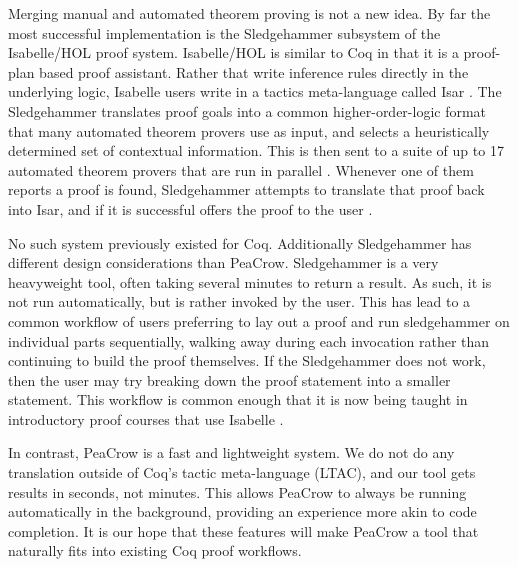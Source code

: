 \documentclass{article}
\begin{document}
Merging manual and automated theorem proving is not a new idea. By far the most successful implementation is the Sledgehammer subsystem of the Isabelle/HOL proof system. Isabelle/HOL is similar to Coq in that it is a proof-plan based proof assistant. Rather that write inference rules directly in the underlying logic, Isabelle users write in a tactics meta-language called Isar \cite{dennis2006comparison}. The Sledgehammer translates proof goals into a common higher-order-logic format that many automated theorem provers use as input, and selects a heuristically determined set of contextual information. This is then sent to a suite of up to 17  automated theorem provers that are run in parallel \cite{blanchette2011hammering}. Whenever one of them reports a proof is found, Sledgehammer attempts to translate that proof back into Isar, and if it is successful offers the proof to the user \cite{meng2006automation}.

No such system previously existed for Coq. Additionally Sledgehammer has different design considerations than PeaCrow. Sledgehammer is a very heavyweight tool, often taking several minutes to return a result. As such, it is not run automatically, but is rather invoked by the user. This has lead to a common workflow of users preferring to lay out a proof and run sledgehammer on individual parts sequentially, walking away during each invocation rather than continuing to build the proof themselves. If the Sledgehammer does not work, then the user may try breaking down the proof statement into a smaller statement. This workflow is common enough that it is now being taught in introductory proof courses that use Isabelle \cite{paulson2010three}.

In contrast, PeaCrow is a fast and lightweight system. We do not do any translation outside of Coq’s tactic meta-language (LTAC), and our tool gets results in seconds, not minutes. This allows PeaCrow to always be running automatically in the background, providing an experience more akin to code completion. It is our hope that these features will make PeaCrow a tool that naturally fits into existing Coq proof workflows.
\end{document}
